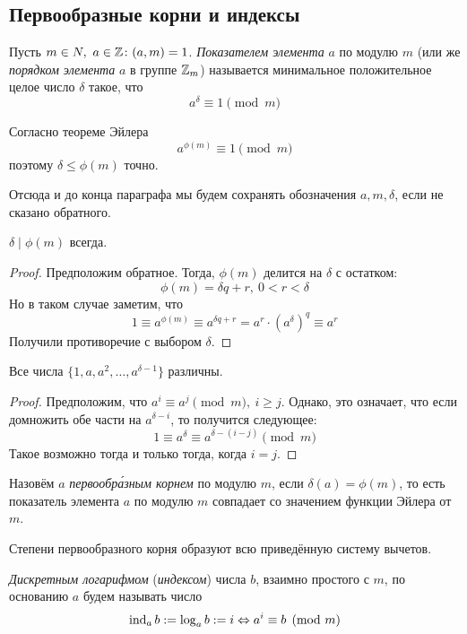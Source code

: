 \subsection{Первообразные корни и индексы}

\begin{definition}
	Пусть $m \in N,\ a \in \mathbb{Z} \colon (a, m) = 1$. \textit{Показателем элемента} $a$ по модулю $m$ (или же \textit{порядком элемента} $a$ в группе $\mathbb{Z}_m$) называется минимальное положительное целое число $\delta$ такое, что
	\[
		a^{\delta} \equiv 1 \pmod m
	\]
\end{definition}

\begin{note}
	Согласно теореме Эйлера
	\[
		a^{\phi(m)} \equiv 1 \pmod m
	\]
	поэтому $\delta \le \phi(m)$ точно.
\end{note}

\begin{note}
	Отсюда и до конца параграфа мы будем сохранять обозначения $a, m, \delta$, если не сказано обратного.
\end{note}

\begin{proposition}
	$\delta \mid \phi(m)$ всегда.
\end{proposition}

\begin{proof}
	Предположим обратное. Тогда, $\phi(m)$ делится на $\delta$ с остатком:
	\[
		\phi(m) = \delta q + r,\ 0 < r < \delta
	\]
	Но в таком случае заметим, что
	\[
		1 \equiv a^{\phi(m)} \equiv a^{\delta q + r} = a^r \cdot (a^{\delta})^q \equiv a^r
	\]
	Получили противоречие с выбором $\delta$.
\end{proof}

\begin{proposition}
	Все числа $\{1, a, a^2, \ldots, a^{\delta - 1}\}$ различны.
\end{proposition}

\begin{proof}
	Предположим, что $a^{i} \equiv a^j \pmod m,\ i \ge j$. Однако, это означает, что если домножить обе части на $a^{\delta - i}$, то получится следующее:
	\[
		1 \equiv a^\delta \equiv a^{\delta - (i - j)} \pmod m
	\]
	Такое возможно тогда и только тогда, когда $i = j$.
\end{proof}

\begin{definition}
	Назовём $a$ \textit{первообр\'{а}зным корнем} по модулю $m$, если $\delta(a) = \phi(m)$, то есть показатель элемента $a$ по модулю $m$ совпадает со значением функции Эйлера от $m$.
\end{definition}

\begin{note}
	Степени первообразного корня образуют всю приведённую систему вычетов.
\end{note}

\begin{definition}
	\textit{Дискретным логарифмом} (\textit{индексом}) числа $b$, взаимно простого с $m$, по основанию $a$ будем называть число
	\[
		\operatorname{ind}_a b := \log_a b := i \Leftrightarrow a^i \equiv b \pmod m
	\]
\end{definition}
